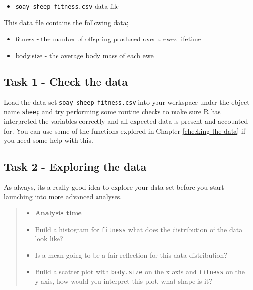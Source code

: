 \documentclass[
]{book}
\providecommand{\tightlist}{%
  \setlength{\itemsep}{0pt}\setlength{\parskip}{0pt}}
\begin{document}
\begin{itemize}
\tightlist
\item
  \texttt{soay\_sheep\_fitness.csv} data file
\end{itemize}

This data file contains the following data;

\begin{itemize}
\tightlist
\item
  fitness - the number of offspring produced over a ewes lifetime
\item
  body.size - the average body mass of each ewe
\end{itemize}

\subsection{Task 1 - Check the data}\label{task-1---check-the-data}

Load the data set \texttt{soay\_sheep\_fitness.csv} into your workspace under the object name \texttt{sheep} and try performing some routine checks to make sure R has interpreted the variables correctly and all expected data is present and accounted for. You can use some of the functions explored in Chapter \ref{checking-the-data} if you need some help with this.

\subsection{Task 2 - Exploring the data}\label{task-2---exploring-the-data-3}

As always, its a really good idea to explore your data set before you start launching into more advanced analyses.

\begin{quote}
\begin{itemize}
\tightlist
\item
  \textbf{Analysis time}
\item
  Build a histogram for \texttt{fitness} what does the distribution of the data look like?
\item
  Is a mean going to be a fair reflection for this data distribution?
\item
  Build a scatter plot with \texttt{body.size} on the x axis and \texttt{fitness} on the y axis, how would you interpret this plot, what shape is it?
\end{itemize}
\end{quote}
\end{document}

